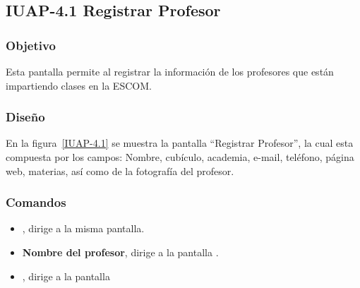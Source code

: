 \subsection{IUAP-4.1  Registrar  Profesor}

\subsubsection{Objetivo}

	
    Esta pantalla permite al   registrar la información de los profesores que están impartiendo clases en la ESCOM.
\subsubsection{Diseño}


    En la figura~\ref{IUAP-4.1} se muestra la pantalla ``Registrar Profesor'', la cual esta compuesta por los campos: Nombre, cubículo, academia, e-mail, teléfono, página web, materias, así como de la fotografía del profesor.



\subsubsection{Comandos}
    \begin{itemize}
	\item {}, dirige a la misma pantalla.
	\item \textbf{Nombre del profesor}, dirige a la pantalla .
	\item {}, dirige a la pantalla 
    \end{itemize}
